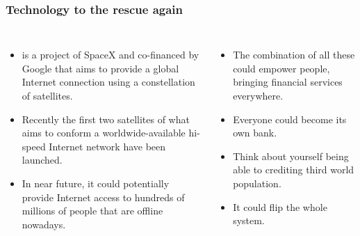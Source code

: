 \documentclass[notitlepage, usenames,dvipsnames]{beamer}
\newcommand{\st}{\structure}
\begin{document}
    \begin{frame}
        \frametitle{Technology to the rescue again}

        \begin{columns}

             {
                \begin{itemize}
                    \itemsep=1.5ex
                    \item \st{\textbf{Starlink}} is a project of SpaceX and co-financed by Google that aims to provide a global Internet connection using a constellation of satellites.
                    \item Recently the first two satellites of what aims to conform a worldwide-available hi-speed Internet network have been launched.
                    \item In near future, it could \alert{potentially provide} Internet access to hundreds of millions of people that are offline nowadays.
                \end{itemize}
            }

             {
                \begin{itemize}
                    \itemsep=1.5ex
                    \item The combination of all these could \alert{empower people}, bringing financial services everywhere.
                    \item Everyone could become its own bank.
                    \item Think about yourself being able to crediting third world population.
                    \item It could flip the whole system.
                \end{itemize}
            }


\end{columns}
\end{frame}
\end{document}
